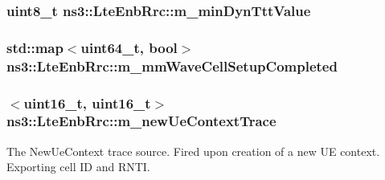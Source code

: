 \subsubsection[{\texorpdfstring{m\+\_\+min\+Dyn\+Ttt\+Value}{m_minDynTttValue}}]{\setlength{\rightskip}{0pt plus 5cm}uint8\+\_\+t ns3\+::\+Lte\+Enb\+Rrc\+::m\+\_\+min\+Dyn\+Ttt\+Value\hspace{0.3cm}{\ttfamily [private]}}\hypertarget{classns3_1_1LteEnbRrc_a76d3b1fbe9168d1e581e709085ff7958}{}\label{classns3_1_1LteEnbRrc_a76d3b1fbe9168d1e581e709085ff7958}
\subsubsection[{\texorpdfstring{m\+\_\+mm\+Wave\+Cell\+Setup\+Completed}{m_mmWaveCellSetupCompleted}}]{\setlength{\rightskip}{0pt plus 5cm}std\+::map$<$uint64\+\_\+t, bool$>$ ns3\+::\+Lte\+Enb\+Rrc\+::m\+\_\+mm\+Wave\+Cell\+Setup\+Completed\hspace{0.3cm}{\ttfamily [private]}}\hypertarget{classns3_1_1LteEnbRrc_ad19d6f4c123115e1d13e34609781ab20}{}\label{classns3_1_1LteEnbRrc_ad19d6f4c123115e1d13e34609781ab20}
\subsubsection[{\texorpdfstring{m\+\_\+new\+Ue\+Context\+Trace}{m_newUeContextTrace}}]{$<$uint16\+\_\+t, uint16\+\_\+t$>$ ns3\+::\+Lte\+Enb\+Rrc\+::m\+\_\+new\+Ue\+Context\+Trace\hspace{0.3cm}{\ttfamily [private]}}\hypertarget{classns3_1_1LteEnbRrc_a9df01020b6a3a37842a029c30f2314db}{}\label{classns3_1_1LteEnbRrc_a9df01020b6a3a37842a029c30f2314db}
The {\ttfamily New\+Ue\+Context} trace source. Fired upon creation of a new UE context. Exporting cell ID and R\+N\+TI. 
